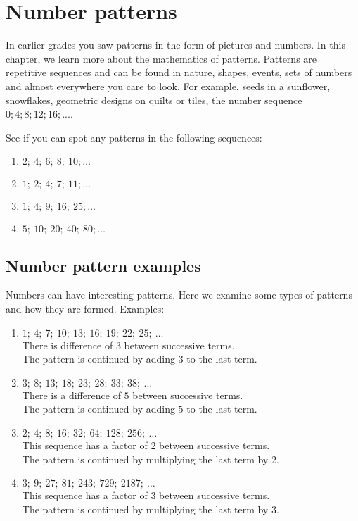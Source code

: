          \chapter{Number patterns}
    \setcounter{figure}{1}
    \setcounter{subfigure}{1}
            
In earlier grades you saw patterns in the form of pictures and numbers. In this chapter, we learn more about the mathematics of patterns. Patterns are repetitive sequences and can be found in nature, shapes, events, sets of numbers and almost everywhere you care to look. For example, seeds in a sunflower, snowflakes, geometric designs on quilts or tiles, the number sequence $0;4;8;12;16;\mathrm{...}$.\par 
See if you can spot any patterns in the following sequences: 
\begin{enumerate}[noitemsep, label=\textbf{\arabic*}. ] 
    \item $2;~4;~6;~8;~10;\ldots$
    \item $1;~2;~4;~7;~11;\ldots$
    \item $1;~4;~9;~16;~25;\ldots$
    \item $5;~10;~20;~40;~80;\ldots$
\end{enumerate}
\section{Number pattern examples}
Numbers can have interesting patterns. Here we examine some types of patterns and how they are formed.
Examples:
\begin{enumerate}[noitemsep, label=\textbf{\arabic*}. ] 
    \item $1;~4;~7;~10;~13;~16;~19;~22;~25;~\ldots$\\
    There is difference of $3$ between successive terms.\\
    The pattern is continued by adding $3$ to the last term.
    \item $3;~8;~13;~18;~23;~28;~33;~38;~\ldots$\\
    There is a difference of $5$ between successive terms.\\
    The pattern is continued by adding $5$ to the last term.
    \item $2;~4;~8;~16;~32;~64;~128;~256;~\ldots$\\
    This sequence has a factor of $2$ between successive terms.\\
    The pattern is continued by multiplying the last term by $2$.
    \item $3;~9;~27;~81;~243;~729;~2187;~\ldots$\\
    This sequence has a factor of $3$ between successive terms.\\
    The pattern is continued by multiplying the last term by $3$.
\end{enumerate}
     

